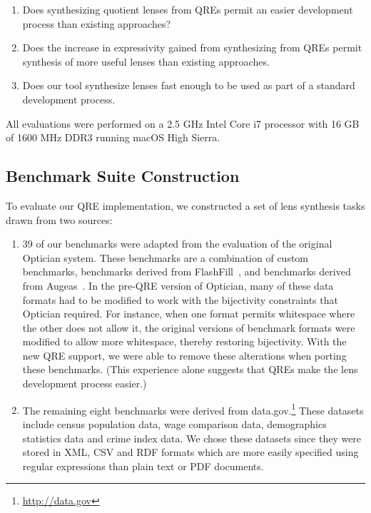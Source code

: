 \documentclass[acmsmall,review,anonymous]{acmart}
\begin{document}
\begin{enumerate}
  \item Does synthesizing quotient lenses from QREs permit an easier development
  process than existing approaches?
  
  \item Does the increase in expressivity gained from synthesizing from QREs
  permit synthesis of more useful lenses than existing approaches.
  
  \item Does our tool synthesize lenses fast enough to be used as part of a
  standard development process.
\end{enumerate}

All evaluations were performed on a 2.5 GHz Intel Core i7 processor with 16 GB
of 1600 MHz DDR3 running macOS High Sierra.


\subsection{Benchmark Suite Construction}

To evaluate our QRE implementation, we constructed a set of lens synthesis tasks
drawn from two sources:
\begin{enumerate}
\item 39 of our benchmarks were adapted from the evaluation of the original
  Optician system.  These benchmarks are a combination of custom benchmarks,
  benchmarks derived from FlashFill~\cite{flashfill}, and benchmarks
  derived from Augeas~\cite{augeas2}. In the pre-QRE version of
  Optician, many of these data formats had to be modified to work with the
  bijectivity constraints that Optician required.  For instance, when one format
  permits whitespace where the other does not allow it, the original versions of
  benchmark formats were modified to allow more whitespace, thereby restoring
  bijectivity.  With the new QRE support, we were able to remove these
  alterations when porting these benchmarks.  (This experience alone suggests
  that QREs make the lens development process easier.)
  
\item The remaining eight benchmarks were derived from
  data.gov.\footnote{\url{http://data.gov}} These datasets include census
  population data, wage comparison data, demographics statistics data and
  crime index data. We chose these datasets since they were stored in XML, CSV
  and RDF formats which are more easily specified using regular expressions than
  plain text or PDF documents.
\end{enumerate}
\end{document}
